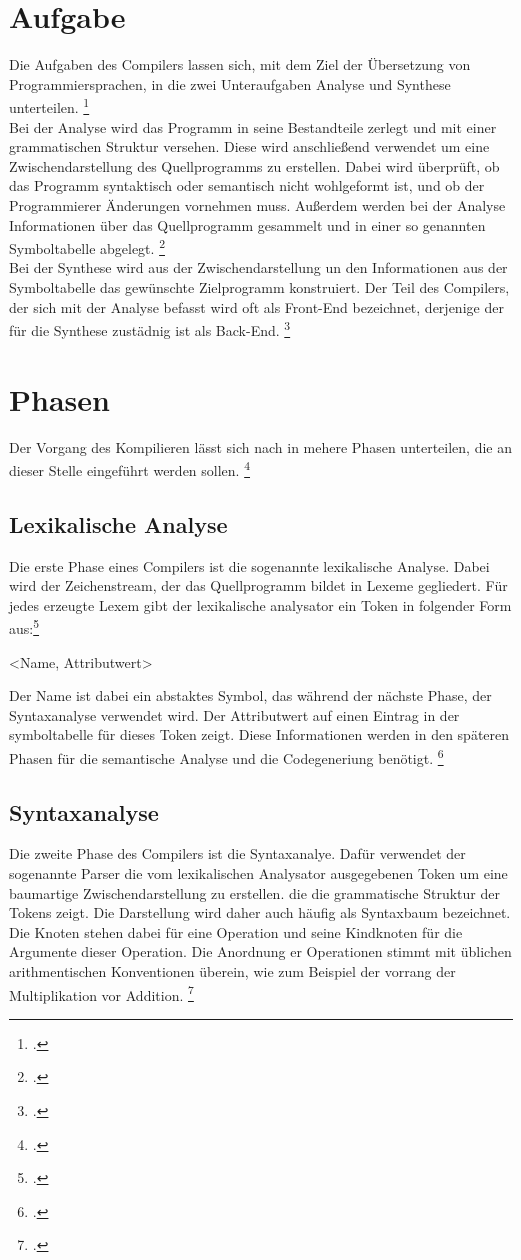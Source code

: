 \section{Aufgabe}
Die Aufgaben des Compilers lassen sich, mit dem Ziel der Übersetzung von Programmiersprachen, in die zwei Unteraufgaben Analyse und Synthese unterteilen. \footcite[Vgl.][S. 6]{Ullmann2008}\\
Bei der Analyse wird das Programm in seine Bestandteile zerlegt und mit einer grammatischen Struktur versehen. Diese wird anschließend verwendet um eine Zwischendarstellung des Quellprogramms zu erstellen. Dabei wird überprüft, ob das Programm syntaktisch oder semantisch nicht wohlgeformt ist, und ob der Programmierer Änderungen vornehmen muss. Außerdem werden bei der Analyse Informationen über das Quellprogramm gesammelt und in einer so genannten Symboltabelle abgelegt.  \footcite[Vgl.][S. 6f]{Ullmann2008}\\
Bei der Synthese wird aus der Zwischendarstellung un den Informationen aus der Symboltabelle das gewünschte Zielprogramm konstruiert. Der Teil des Compilers, der sich mit der Analyse befasst wird oft als Front-End bezeichnet, derjenige der für die Synthese zustädnig ist als Back-End.  \footcite[Vgl.][S. 7]{Ullmann2008}
\section{Phasen}
Der Vorgang des Kompilieren lässt sich nach \citeauthor{Ullmann2008} in mehere Phasen unterteilen, die an dieser Stelle eingeführt werden sollen. \footcite[Vgl.][S. 6]{Ullmann2008}
\subsection{Lexikalische Analyse}
Die erste Phase eines Compilers ist die sogenannte lexikalische Analyse. Dabei wird der Zeichenstream, der das Quellprogramm bildet in Lexeme gegliedert. Für jedes erzeugte Lexem gibt der lexikalische analysator ein Token in folgender Form aus:\footcite[Vgl.][S. 7f]{Ullmann2008}
\begin{center}
 <Name, Attributwert>
\end{center}
Der Name ist dabei ein abstaktes Symbol, das während der nächste Phase, der Syntaxanalyse verwendet wird. Der Attributwert auf einen Eintrag in der symboltabelle für dieses Token zeigt. Diese Informationen werden in den späteren Phasen für die semantische Analyse und die Codegeneriung benötigt. \footcite[Vgl.][S. 7f]{Ullmann2008}
\subsection{Syntaxanalyse}
Die zweite Phase des Compilers ist die Syntaxanalye. Dafür verwendet der sogenannte Parser die vom lexikalischen Analysator ausgegebenen Token um eine baumartige Zwischendarstellung zu erstellen. die die grammatische Struktur der Tokens zeigt. Die Darstellung wird daher auch häufig als Syntaxbaum bezeichnet. Die Knoten stehen dabei für eine Operation und seine Kindknoten für die Argumente dieser Operation. Die Anordnung er Operationen stimmt mit üblichen arithmentischen Konventionen überein, wie zum Beispiel der vorrang der Multiplikation vor Addition. \footcite[Vgl.][S. 9]{Ullmann2008}
